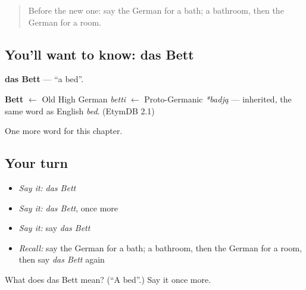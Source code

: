 \begin{quote}
Before the new one: say the German for a bath; a bathroom, then the German for a room.
\end{quote}

\subsection*{You'll want to know: das Bett}
\textbf{das Bett} — \textquotedblleft{}a bed\textquotedblright{}.

\begin{cousinweb}
\textbf{Bett} $\leftarrow$ Old High German \emph{betti} $\leftarrow$ Proto-Germanic \emph{*badją} — inherited, the same word as English \emph{bed}. (EtymDB 2.1)
\end{cousinweb}

\begin{grammarlens}[title={What you've built}]
One more word for this chapter.
\end{grammarlens}

\subsection*{Your turn}
\begin{itemize}
\raggedright
  \item \emph{Say it:} \emph{das Bett}
  \item \emph{Say it:} \emph{das Bett}, once more
  \item \emph{Say it:} say \emph{das Bett}
  \item \emph{Recall:} say the German for a bath; a bathroom, then the German for a room, then say \emph{das Bett} again
\end{itemize}

\begin{tcolorbox}[breakable,colback=teal!4,colframe=teal!35!black,title={Before you move on}]
What does das Bett mean? (\textquotedblleft{}A bed\textquotedblright{}.) Say it once more.
\end{tcolorbox}
